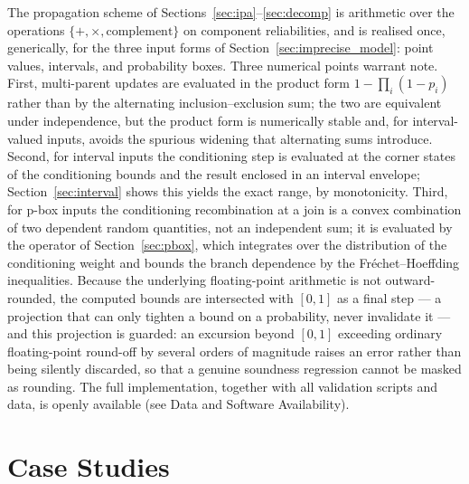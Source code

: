 \documentclass[preprint,12pt]{elsarticle}
\theoremstyle{definition}
\begin{document}
The propagation scheme of Sections~\ref{sec:ipa}--\ref{sec:decomp} is arithmetic over the operations
$\{+,\times,\text{complement}\}$ on component reliabilities, and is realised once, generically, for the
three input forms of Section~\ref{sec:imprecise_model}: point values, intervals, and probability boxes.
Three numerical points warrant note. First, multi-parent updates are evaluated in the product form
$1-\prod_i(1-p_i)$ rather than by the alternating inclusion--exclusion sum; the two are equivalent under
independence, but the product form is numerically stable and, for interval-valued inputs, avoids the
spurious widening that alternating sums introduce. Second, for interval inputs the conditioning step is
evaluated at the corner states of the conditioning bounds and the result enclosed in an interval
envelope; Section~\ref{sec:interval} shows this yields the exact range, by monotonicity. Third, for
p-box inputs the conditioning recombination at a join is a convex combination of two dependent random
quantities, not an independent sum; it is evaluated by the operator of Section~\ref{sec:pbox}, which
integrates over the distribution of the conditioning weight and bounds the branch dependence by the
Fr\'echet--Hoeffding inequalities. Because the underlying floating-point arithmetic is not
outward-rounded, the computed bounds are intersected with $[0,1]$ as a final step --- a projection that
can only tighten a bound on a probability, never invalidate it --- and this projection is guarded: an
excursion beyond $[0,1]$ exceeding ordinary floating-point round-off by several orders of magnitude
raises an error rather than being silently discarded, so that a genuine soundness regression cannot be
masked as rounding. The full implementation, together with all validation scripts and data, is openly
available (see Data and Software Availability).

\section{Case Studies}\label{sec:cases}
\end{document}

